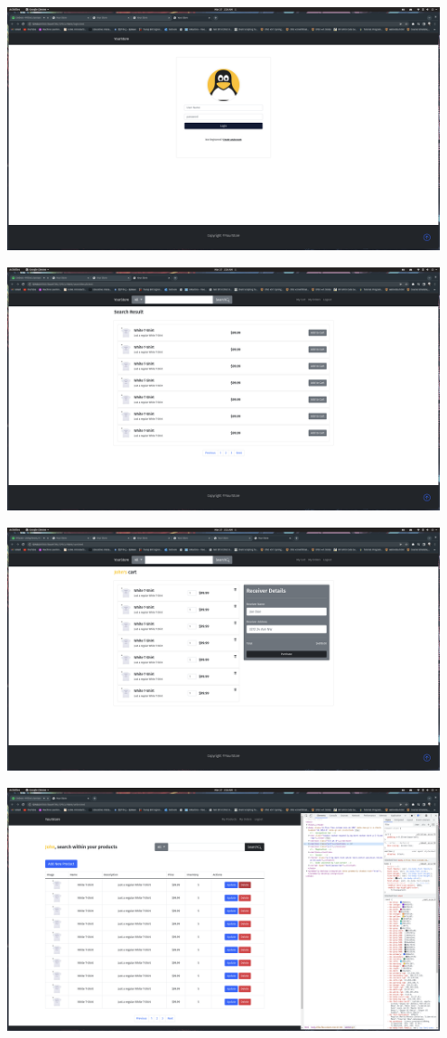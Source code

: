 \documentclass[12pt]{article}
\begin{document}
\includegraphics[width=0.95\textwidth]{Screenshots/login.png}

\includegraphics[width=0.95\textwidth]{Screenshots/search_result.png}

\includegraphics[width=0.95\textwidth]{Screenshots/cart.png}

\includegraphics[width=0.95\textwidth]{Screenshots/seller_products.png}
\end{document}
